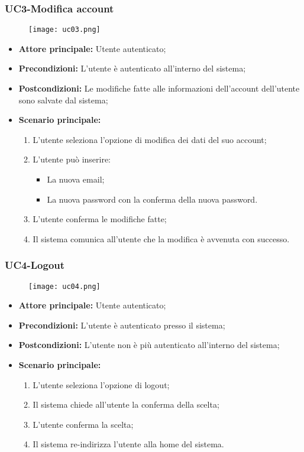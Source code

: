 \pagebreak
\subsubsection{UC3-Modifica account}
\begin{figure}[h] \texttt{[image: uc03.png]} \end{figure}
\begin{itemize}
    \item \textbf{Attore principale:} Utente autenticato;
    \item \textbf{Precondizioni:} L'utente è autenticato all'interno del sistema;
    \item \textbf{Postcondizioni:} Le modifiche fatte alle informazioni dell'account dell'utente sono salvate dal sistema;
    \item \textbf{Scenario principale:}
        \begin{enumerate}
            \item L'utente seleziona l'opzione di modifica dei dati del suo account;
            \item L'utente può inserire:
              \begin{itemize}
                \item La nuova email;
                \item La nuova password con la conferma della nuova password.
              \end{itemize}
            \item L'utente conferma le modifiche fatte;
            \item Il sistema comunica all'utente che la modifica è avvenuta con successo.
        \end{enumerate}
\end{itemize}

\subsubsection{UC4-Logout}
\begin{figure}[h] \texttt{[image: uc04.png]} \end{figure}
\begin{itemize}
    \item \textbf{Attore principale:} Utente autenticato;
    \item \textbf{Precondizioni:} L'utente è autenticato presso il sistema;
    \item \textbf{Postcondizioni:} L'utente non è più autenticato all'interno del sistema;
    \item \textbf{Scenario principale:}
    \begin{enumerate}
        \item L'utente seleziona l'opzione di logout;
        \item Il sistema chiede all'utente la conferma della scelta;
        \item L'utente conferma la scelta;
        \item Il sistema re-indirizza l'utente alla home del sistema.
    \end{enumerate}
\end{itemize}


